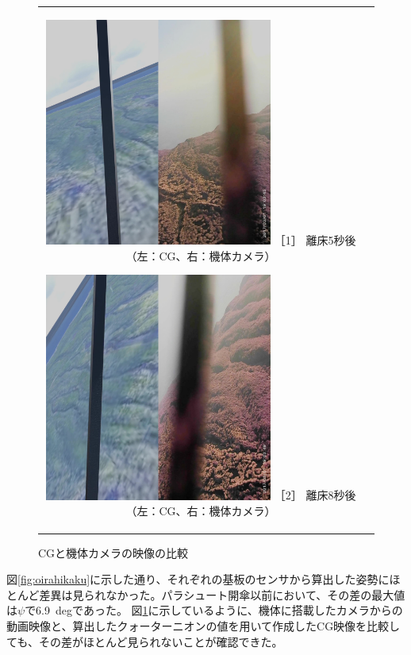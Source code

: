 \documentclass[a4paper,11pt,titlepage,uplatex]{jsarticle}
\begin{document}
\begin{figure}[H]
    \begin{tabular}{cc}
        \begin{minipage}{.48\textwidth}
            \centering
            \includegraphics[width=75mm]{pic_sim/compare_5.jpg}
            \hspace{16mm} {\small［1］ 離床5秒後（左：CG、右：機体カメラ）}
        \end{minipage}
        \begin{minipage}{.48\textwidth}
            \centering
            \includegraphics[width=75mm]{pic_sim/compare_8.jpg}
            \hspace{16mm} {\small［2］ 離床8秒後（左：CG、右：機体カメラ）}
        \end{minipage}
    \end{tabular}
    \centering
    \caption{CGと機体カメラの映像の比較}
    \label{fig:dougahikaku}
\end{figure}

図\ref{fig:oirahikaku}に示した通り、それぞれの基板のセンサから算出した姿勢にほとんど差異は見られなかった。パラシュート開傘以前において、その差の最大値は$\psi$で\SI{6.9}{deg}であった。
図\ref{fig:dougahikaku}に示しているように、機体に搭載したカメラからの動画映像と、算出したクォーターニオンの値を用いて作成したCG映像を比較しても、その差がほとんど見られないことが確認できた。
\end{document}
